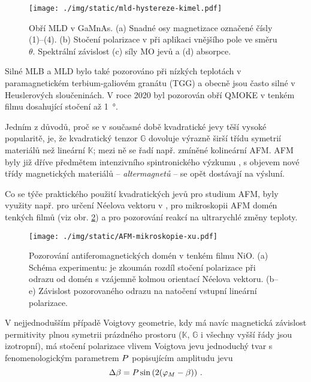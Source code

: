 \begin{figure}[htbp]
    \centering
    \texttt{[image: ./img/static/mld-hystereze-kimel.pdf]}
    \caption{Obří MLD v GaMnAs. (a) Snadné osy magnetizace označené čísly (1)--(4). (b) Stočení polarizace v při aplikaci vnějšího pole ve směru $\theta$. Spektrální závislost (c) síly MO jevů a (d) absorpce. \cite{kimelObservationGiantMagnetic2005}}
    \label{fig:obri-MLD}
\end{figure}

Silné MLB a MLD bylo také pozorováno při nízkých teplotách v paramagnetickém terbium-galiovém granátu (TGG)\cite{akbarLowTemperatureVoigt2017} a obecně jsou často silné v Heuslerových sloučeninách\cite{hamrleHugeQuadraticMagnetooptical2007}.
V roce 2020 byl pozorován obří QMOKE v tenkém filmu  dosahující stočení až \SI{1}{\degree}\cite{katsGiantQuadraticMagnetooptical2020}.

Jedním z důvodů, proč se v současné době kvadratické jevy těší vysoké popularitě, je, že kvadratický tenzor $\mathbb{G}$ dovoluje výrazně širší třídu symetrií materiálů než lineární $\mathbb{K}$; mezi ně se řadí např. zmíněné kolineární AFM. 
AFM byly již dříve předmětem intenzivního spintronického výzkumu \cite{nemecAntiferromagneticOptospintronics2018,jungwirthAntiferromagneticSpintronics2016}, 
s objevem nové třídy magnetických materiálů -- \emph{altermagnetů}\cite{smejkalAltermagnetismSpinmomentumLocked2021} -- se opět dostávají na výsluní.

Co se týče praktického použití kvadratických jevů pro studium AFM, byly využity např. pro určení Néelova vektoru v \cite{saidlOpticalDeterminationNeel2017}, pro mikroskopii AFM domén\cite{xuImagingAntiferromagneticDomains2019} tenkých filmů  (viz obr. \ref{fig:AFM-mikroskopie-domen}) a pro pozorování reakcí  na ultrarychlé změny teploty\cite{yangMagnetoopticResponseMetallic2019}.

\begin{figure}[htbp]
    \centering
    \texttt{[image: ./img/static/AFM-mikroskopie-xu.pdf]}
    \caption{Pozorování antiferomagnetických domén v tenkém filmu NiO. (a) Schéma experimentu: je zkoumán rozdíl stočení polarizace při odrazu od domén s vzájemně kolmou orientací Néelova vektoru. (b--e) Závislost pozorovaného odrazu na natočení vstupní lineární polarizace. \cite{xuImagingAntiferromagneticDomains2019}}
    \label{fig:AFM-mikroskopie-domen}
\end{figure}

V nejjednodušším případě Voigtovy geometrie, kdy má navíc magnetická závislost permitivity plnou symetrii prázdného prostoru ($\mathbb{K}$, $\mathbb{G}$ i všechny vyšší řády jsou izotropní), má stočení polarizace vlivem Voigtova jevu jednoduchý tvar s fenomenologickým parametrem $P$ popisujícím amplitudu jevu\cite{tesarovaHighPrecisionMagnetic2012}
\begin{equation} 
\label{eqn:PMLD}
    \Delta \beta=P \sin\left(2(\varphi_M-\beta)\right) \,.
\end{equation}

